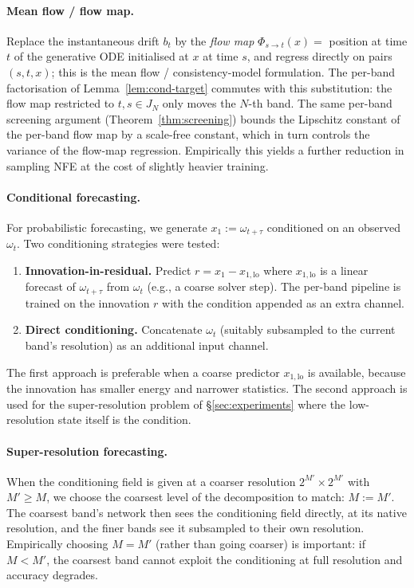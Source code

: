 \documentclass[11pt]{amsart}
\theoremstyle{remark}
\numberwithin{equation}{section}
\begin{document}
\paragraph{Mean flow / flow map.}
Replace the instantaneous drift $b_t$ by the \emph{flow map} $\Phi_{s\to t}(x)=$ position at time $t$ of the generative ODE initialised at $x$ at time $s$, and regress directly on pairs $(s,t,x)$; this is the mean flow / consistency-model formulation. The per-band factorisation of Lemma~\ref{lem:cond-target} commutes with this substitution: the flow map restricted to $t,s\in J_N$ only moves the $N$-th band. The same per-band screening argument (Theorem~\ref{thm:screening}) bounds the Lipschitz constant of the per-band flow map by a scale-free constant, which in turn controls the variance of the flow-map regression. Empirically this yields a further reduction in sampling NFE at the cost of slightly heavier training.

\paragraph{Conditional forecasting.}
For probabilistic forecasting, we generate $x_1:=\omega_{t+\tau}$ conditioned on an observed $\omega_t$. Two conditioning strategies were tested:
\begin{enumerate}
\item \textbf{Innovation-in-residual.} Predict $r = x_1 - x_{1,\mathrm{lo}}$ where $x_{1,\mathrm{lo}}$ is a linear forecast of $\omega_{t+\tau}$ from $\omega_t$ (e.g., a coarse solver step). The per-band pipeline is trained on the innovation $r$ with the condition appended as an extra channel.
\item \textbf{Direct conditioning.} Concatenate $\omega_t$ (suitably subsampled to the current band's resolution) as an additional input channel.
\end{enumerate}
The first approach is preferable when a coarse predictor $x_{1,\mathrm{lo}}$ is available, because the innovation has smaller energy and narrower statistics. The second approach is used for the super-resolution problem of \S\ref{sec:experiments} where the low-resolution state itself is the condition.

\paragraph{Super-resolution forecasting.}
When the conditioning field is given at a coarser resolution $2^{M'}\times 2^{M'}$ with $M'\ge M$, we choose the coarsest level of the decomposition to match: $M:=M'$. The coarsest band's network then sees the conditioning field directly, at its native resolution, and the finer bands see it subsampled to their own resolution. Empirically choosing $M=M'$ (rather than going coarser) is important: if $M<M'$, the coarsest band cannot exploit the conditioning at full resolution and accuracy degrades.
\end{document}
